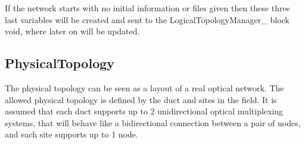 If the network starts with no initial information or files given then these three last variables will be created and sent to the LogicalTopologyManager\_  block void, where later on will be updated. 
\subsection{PhysicalTopology}

The physical topology can be seen as a layout of a real optical network. The allowed physical topology is defined by the duct and sites in the field. It is assumed that each duct supports up to 2 unidirectional  optical multiplexing systems, that will behave like a bidirectional connection between a pair of nodes, and each site supports up to 1 node.\\ \\

